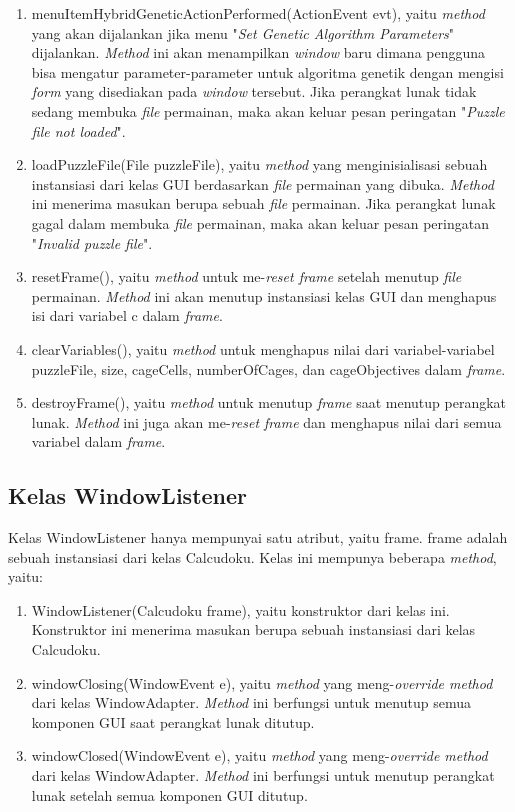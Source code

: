 \begin{enumerate}
\item menuItemHybridGeneticActionPerformed(ActionEvent evt), yaitu \textit{method} yang akan dijalankan jika menu "\textit{Set Genetic Algorithm Parameters}" dijalankan. \textit{Method} ini akan menampilkan \textit{window} baru dimana pengguna bisa mengatur parameter-parameter untuk algoritma genetik dengan mengisi \textit{form} yang disediakan pada \textit{window} tersebut. Jika perangkat lunak tidak sedang membuka \textit{file} permainan, maka akan keluar pesan peringatan "\textit{Puzzle file not loaded}".
\item loadPuzzleFile(File puzzleFile), yaitu \textit{method} yang menginisialisasi sebuah instansiasi dari kelas GUI berdasarkan \textit{file} permainan yang dibuka. \textit{Method} ini menerima masukan berupa sebuah \textit{file} permainan. Jika perangkat lunak gagal dalam membuka \textit{file} permainan, maka akan keluar pesan peringatan "\textit{Invalid puzzle file}".
\item resetFrame(), yaitu \textit{method} untuk me-\textit{reset frame} setelah menutup \textit{file} permainan. \textit{Method} ini akan menutup instansiasi kelas GUI dan menghapus isi dari variabel c dalam \textit{frame}.
\item clearVariables(), yaitu \textit{method} untuk menghapus nilai dari variabel-variabel puzzleFile, size, cageCells, numberOfCages, dan cageObjectives dalam \textit{frame}.
\item destroyFrame(), yaitu \textit{method} untuk menutup \textit{frame} saat menutup perangkat lunak. \textit{Method} ini juga akan me-\textit{reset frame} dan menghapus nilai dari semua variabel dalam \textit{frame}.
\end{enumerate}

\subsection{Kelas WindowListener}
\label{sec:kelaswindowlistener}

Kelas WindowListener hanya mempunyai satu atribut, yaitu frame. frame adalah sebuah instansiasi dari kelas Calcudoku. Kelas ini mempunya beberapa \textit{method}, yaitu:

\begin{enumerate}
\item WindowListener(Calcudoku frame), yaitu konstruktor dari kelas ini. Konstruktor ini menerima masukan berupa sebuah instansiasi dari kelas Calcudoku.
\item windowClosing(WindowEvent e), yaitu \textit{method} yang meng-\textit{override method} dari kelas WindowAdapter. \textit{Method} ini berfungsi untuk menutup semua komponen GUI saat perangkat lunak ditutup.
\item windowClosed(WindowEvent e), yaitu \textit{method} yang meng-\textit{override method} dari kelas WindowAdapter. \textit{Method} ini berfungsi untuk menutup perangkat lunak setelah semua komponen GUI ditutup.
\end{enumerate}

